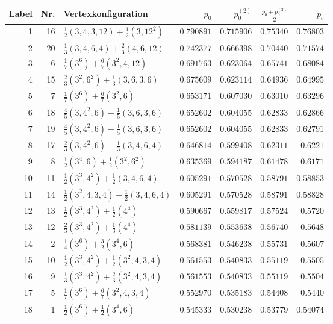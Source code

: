 \begin{table}[tbp]
\centering
\begin{tabular}{|r|r|l|r|r|r||r|}
\hline
 Label & Nr. & Vertexkonfiguration & $p_0$ &  $p_0^{(2)}$&$\frac{p_0+p_0^{(2)}}{2}$&$p_c$ \\
\hline
\hline
1&16&$\frac{1}{2}(3,4,3,12)+\frac{1}{2}(3,12^2)$&$0.790891$&$0.715906$&$0.75340$&$0.76803$\\
2&20&$\frac{1}{3}(3,4,6,4)+\frac{2}{3}(4,6,12)$&$0.742377$&$0.666398$&$0.70440$&$0.71574$\\
3&6&$\frac{1}{7}(3^6)+\frac{6}{7}(3^2,4,12)$&$0.691763$&$0.623064$&$0.65741$&$0.68084$\\
4&15&$\frac{2}{3}(3^2,6^2)+\frac{1}{3}(3,6,3,6)$&$0.675609$&$0.623114$&$0.64936$&$0.64995$\\
5&7&$\frac{1}{7}(3^6)+\frac{6}{7}(3^2,6)$&$0.653171$&$0.607030$&$0.63010$&$0.63296$\\
6&18&$\frac{4}{5}(3,4^2,6)+\frac{1}{5}(3,6,3,6)$&$0.652602$&$0.604055$&$0.62833$&$0.62866$\\
7&19&$\frac{4}{5}(3,4^2,6)+\frac{1}{5}(3,6,3,6)$&$0.652602$&$0.604055$&$0.62833$&$0.62791$\\
8&17&$\frac{2}{3}(3,4^2,6)+\frac{1}{3}(3,4,6,4)$&$0.646814$&$0.599408$&$0.62311$&$0.6221$\\
9&8&$\frac{1}{2}(3^4,6)+\frac{1}{2}(3^2,6^2)$&$0.635369$&$0.594187$&$0.61478$&$0.6171$\\
10&11&$\frac{1}{2}(3^3,4^2)+\frac{1}{2}(3,4,6,4)$&$0.605291$&$0.570528$&$0.58791$&$0.58853$\\
11&14&$\frac{1}{2}(3^2,4,3,4)+\frac{1}{2}(3,4,6,4)$&$0.605291$&$0.570528$&$0.58791$&$0.58828$\\
12&13& $\frac{1}{2}(3^3,4^2)+\frac{1}{2}(4^4)$& $0.590667$&$0.559817$&$0.57524$&$0.5720$\\
13&12&$\frac{2}{3}(3^3,4^2)+\frac{1}{3}(4^4)$&$0.581139$&$0.553638$&$0.56740$&$0.5648$\\
14&2&$\frac{1}{4}(3^6)+\frac{3}{2}(3^4,6)$ &$0.568381$&$0.546238$&$0.55731$&$0.5607$\\
15&10&$\frac{1}{2}(3^3,4^2)+\frac{1}{2}(3^2,4,3,4)$&$0.561553$&$0.540833$&$0.55119$&$0.5505$\\
16&9&$\frac{1}{3}(3^3,4^2)+\frac{2}{3}(3^2,4,3,4)$&$0.561553$&$0.540833$&$0.55119$&$0.5504$\\
17&5&$\frac{1}{7}(3^6)+\frac{6}{7}(3^2,4,3,4)$&$0.552970$&$0.535183$&$0.54408$&$0.5440$\\
18&1&$\frac{1}{2}(3^6)+\frac{1}{2}(3^4,6)$&$0.545333$&$0.530238$&$0.53779$&$0.54074$\\

\end{tabular}
\end{table}
